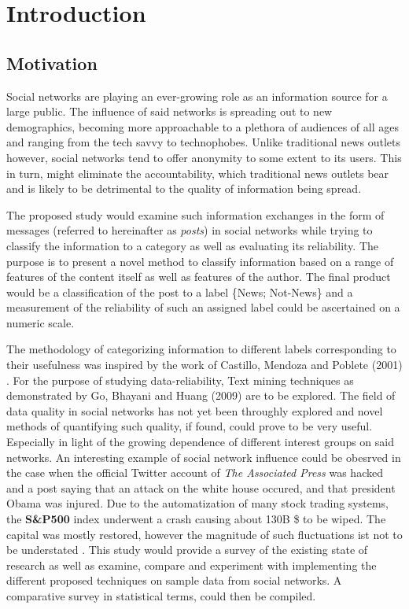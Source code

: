 \section{Introduction}
	\subsection{Motivation}
		Social networks are playing an ever-growing role as an information source for a large public. The influence of said networks is spreading out to new demographics, becoming more approachable to a plethora of audiences of all ages and ranging from the tech savvy to technophobes. Unlike traditional news outlets however, social networks tend to offer anonymity to some extent to its users. This in turn, might eliminate the accountability, which traditional news outlets bear and is likely to be detrimental to the quality of information being spread.
		
		\par
		
		The proposed study would examine such information exchanges in the form of messages (referred to hereinafter as \textit{posts}) in social networks while trying to classify the information to a category as well as evaluating its reliability. The purpose is to present a novel method to classify information based on a range of features of the content itself as well as  features of the author. The final product would be a classification of the post to a label  \{News; Not-News\} and a measurement of the reliability of such an assigned label could be ascertained on a numeric scale.
		
		\par
		
		The methodology of categorizing information to different labels corresponding to their usefulness was inspired by the work of Castillo, Mendoza and Poblete (2001) \cite{castillo}. For the purpose of studying data-reliability, Text mining techniques as demonstrated by Go, Bhayani and Huang (2009)\cite{go} are to be explored. The field of data quality in social networks has not yet been throughly explored and novel methods of quantifying such quality, if found, could prove to be very useful. Especially in light of the growing dependen{\tiny }ce of different interest groups on said networks. An interesting example of social network influence could be obesrved in the case when the official Twitter account of \textit{ The Associated Press} was hacked and a post saying that an attack on the white house occured, and that president Obama was injured. Due to the automatization of many stock trading systems, the \textbf{ S\&P500} index underwent a crash causing about 130B \$ to be wiped. The capital was mostly restored, however the magnitude of such fluctuations ist not to be understated \cite{hack}. This study would provide a survey of the existing state of research as well as examine, compare and experiment with implementing the different proposed techniques on sample data from social networks. A comparative survey in statistical terms, could then be compiled.
		

